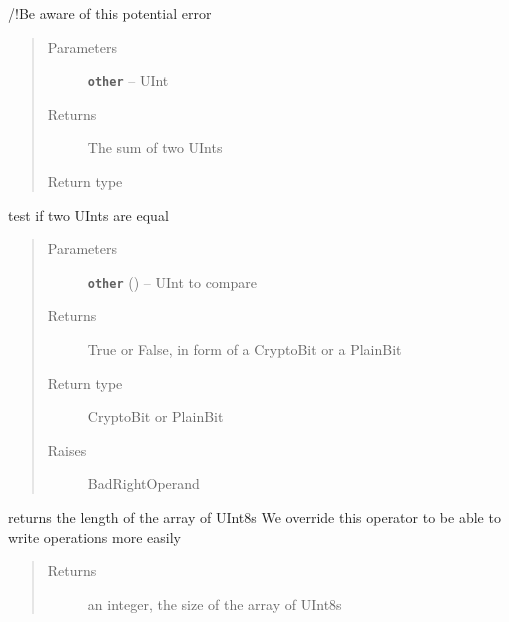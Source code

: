 \documentclass[letterpaper,10pt,english]{sphinxmanual}
\begin{document}
\begin{fulllineitems}
\begin{fulllineitems}
/!Be aware of this potential error
\begin{quote}\begin{description}
\item[{Parameters}] \leavevmode
\textbf{\texttt{other}} -- UInt

\item[{Returns}] \leavevmode
The sum of two UInts

\item[{Return type}] \leavevmode
{\hyperref[datatypes.integers:module\string-datatypes.integers.UInt]{}}

\end{description}\end{quote}

\end{fulllineitems}


\begin{fulllineitems}
\label{datatypes.integers:datatypes.integers.UInt.UInt.__eq__}
test if two UInts are equal
\begin{quote}\begin{description}
\item[{Parameters}] \leavevmode
\textbf{\texttt{other}} ({\hyperref[datatypes.integers:module\string-datatypes.integers.UInt]{}}) -- UInt to compare

\item[{Returns}] \leavevmode
True or False, in form of a CryptoBit or a PlainBit

\item[{Return type}] \leavevmode
CryptoBit or PlainBit

\item[{Raises}] \leavevmode
BadRightOperand

\end{description}\end{quote}

\end{fulllineitems}


\begin{fulllineitems}
\label{datatypes.integers:datatypes.integers.UInt.UInt.__len__}
returns the length of the array of UInt8s
We override this operator to be able to write operations more easily
\begin{quote}\begin{description}
\item[{Returns}] \leavevmode
an integer, the size of the array of UInt8s


\end{description}
\end{quote}
\end{fulllineitems}
\end{fulllineitems}
\end{document}
